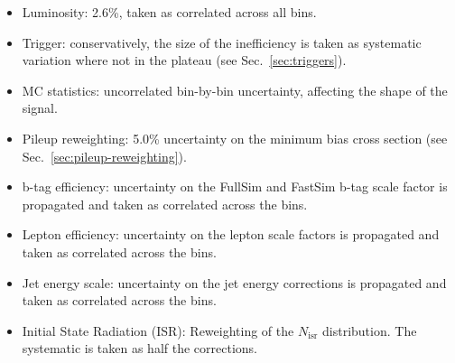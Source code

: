 \begin{itemize}
    \item Luminosity: 2.6\%, taken as correlated across all bins.
    \item Trigger: conservatively, the size of the inefficiency is taken as
        systematic variation where not in the plateau (see Sec.~\ref{sec:triggers}).
    \item MC statistics:  uncorrelated bin-by-bin uncertainty, affecting the
        shape of the signal.
    \item Pileup reweighting: 5.0\% uncertainty on the minimum bias cross section
        (see Sec.~\ref{sec:pileup-reweighting}).
    \item b-tag efficiency: uncertainty on the FullSim and FastSim b-tag scale
        factor is propagated and taken as correlated across the bins.
    \item Lepton efficiency: uncertainty on the lepton scale factors is
        propagated and taken as correlated across the bins.
    \item Jet energy scale: uncertainty on the jet energy corrections is
        propagated and taken as correlated across the bins.
    \item Initial State Radiation (ISR): Reweighting of the $N_{\text{isr}}$
        distribution. The systematic is taken as half the corrections.
\end{itemize}

